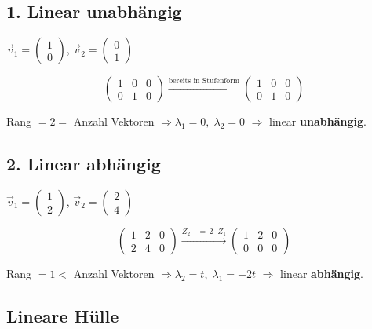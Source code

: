 \documentclass[9pt,a4paper]{article}
\begin{document}
    \subsection*{1. Linear unabhängig}
    
    $\vec{v}_1 = \begin{pmatrix}1\\0\end{pmatrix}$, $\vec{v}_2 = \begin{pmatrix}0\\1\end{pmatrix}$
    
    \[
    \left(\begin{array}{cc|c} 1 & 0 & 0 \\ 0 & 1 & 0 \end{array}\right)
    \xrightarrow{\text{bereits in Stufenform}}
    \left(\begin{array}{cc|c} 1 & 0 & 0 \\ 0 & 1 & 0 \end{array}\right)
    \]
    
    Rang $= 2 =$ Anzahl Vektoren $\Rightarrow \lambda_1 = 0,\; \lambda_2 = 0$
    $\Rightarrow$ linear \textbf{unabhängig}.
    
    \subsection*{2. Linear abhängig}
    
    $\vec{v}_1 = \begin{pmatrix}1\\2\end{pmatrix}$, $\vec{v}_2 = \begin{pmatrix}2\\4\end{pmatrix}$
    
    \[
    \left(\begin{array}{cc|c} 1 & 2 & 0 \\ 2 & 4 & 0 \end{array}\right)
    \xrightarrow{Z_2 \,-=\, 2 \cdot Z_1}
    \left(\begin{array}{cc|c} 1 & 2 & 0 \\ 0 & 0 & 0 \end{array}\right)
    \]
    
    Rang $= 1 <$ Anzahl Vektoren $\Rightarrow \lambda_2 = t,\; \lambda_1 = -2t$
    $\Rightarrow$ linear \textbf{abhängig}.
    
    \subsection{Lineare Hülle}
    
\end{document}

